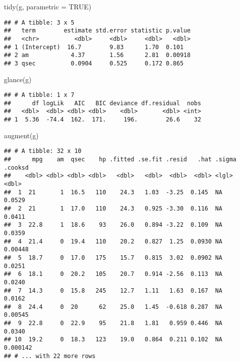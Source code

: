 \documentclass[
]{book}
\newenvironment{Shaded}{\begin{snugshade}}{\end{snugshade}}
\newcommand{\AttributeTok}[1]{\textcolor[rgb]{0.77,0.63,0.00}{#1}}
\newcommand{\ConstantTok}[1]{\textcolor[rgb]{0.00,0.00,0.00}{#1}}
\newcommand{\FunctionTok}[1]{\textcolor[rgb]{0.00,0.00,0.00}{#1}}
\newcommand{\NormalTok}[1]{#1}
\begin{document}
\begin{Shaded}
\begin{Highlighting}[]
\FunctionTok{tidy}\NormalTok{(g, }\AttributeTok{parametric =} \ConstantTok{TRUE}\NormalTok{)}
\end{Highlighting}
\end{Shaded}

\begin{verbatim}
## # A tibble: 3 x 5
##   term        estimate std.error statistic p.value
##   <chr>          <dbl>     <dbl>     <dbl>   <dbl>
## 1 (Intercept)  16.7        9.83      1.70  0.101  
## 2 am            4.37       1.56      2.81  0.00918
## 3 qsec          0.0904     0.525     0.172 0.865
\end{verbatim}

\begin{Shaded}
\begin{Highlighting}[]
\FunctionTok{glance}\NormalTok{(g)}
\end{Highlighting}
\end{Shaded}

\begin{verbatim}
## # A tibble: 1 x 7
##      df logLik   AIC   BIC deviance df.residual  nobs
##   <dbl>  <dbl> <dbl> <dbl>    <dbl>       <dbl> <int>
## 1  5.36  -74.4  162.  171.     196.        26.6    32
\end{verbatim}

\begin{Shaded}
\begin{Highlighting}[]
\FunctionTok{augment}\NormalTok{(g)}
\end{Highlighting}
\end{Shaded}

\begin{verbatim}
## # A tibble: 32 x 10
##      mpg    am  qsec    hp .fitted .se.fit .resid   .hat .sigma  .cooksd
##    <dbl> <dbl> <dbl> <dbl>   <dbl>   <dbl>  <dbl>  <dbl> <lgl>     <dbl>
##  1  21       1  16.5   110    24.3   1.03  -3.25  0.145  NA     0.0529  
##  2  21       1  17.0   110    24.3   0.925 -3.30  0.116  NA     0.0411  
##  3  22.8     1  18.6    93    26.0   0.894 -3.22  0.109  NA     0.0359  
##  4  21.4     0  19.4   110    20.2   0.827  1.25  0.0930 NA     0.00448 
##  5  18.7     0  17.0   175    15.7   0.815  3.02  0.0902 NA     0.0251  
##  6  18.1     0  20.2   105    20.7   0.914 -2.56  0.113  NA     0.0240  
##  7  14.3     0  15.8   245    12.7   1.11   1.63  0.167  NA     0.0162  
##  8  24.4     0  20      62    25.0   1.45  -0.618 0.287  NA     0.00545 
##  9  22.8     0  22.9    95    21.8   1.81   0.959 0.446  NA     0.0340  
## 10  19.2     0  18.3   123    19.0   0.864  0.211 0.102  NA     0.000142
## # ... with 22 more rows
\end{verbatim}
\end{document}
